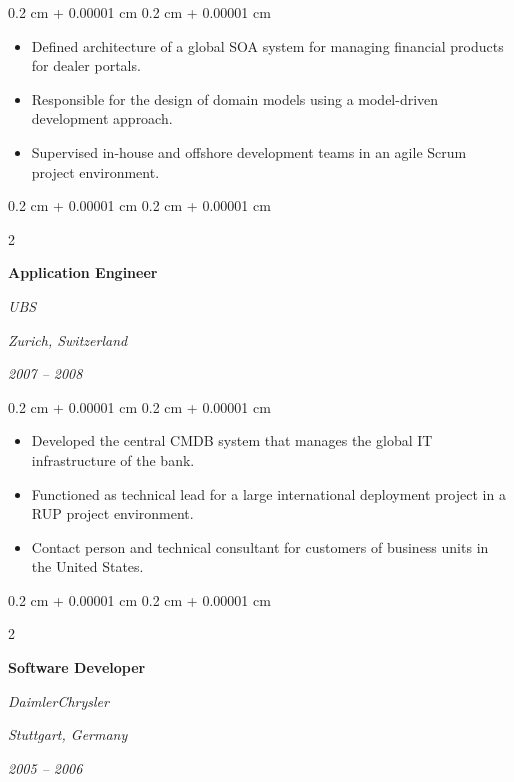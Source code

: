 \documentclass[10pt, a4paper]{article}
\newenvironment{highlights}{
    \begin{itemize}[
        topsep=0.10 cm,
        parsep=0.10 cm,
        partopsep=0pt,
        itemsep=0pt,
        leftmargin=0.4 cm + 10pt
    ]
}{
    \end{itemize}
} %
\newenvironment{onecolentry}{
    \begin{adjustwidth}{
        0.2 cm + 0.00001 cm
    }{
        0.2 cm + 0.00001 cm
    }
}{
    \end{adjustwidth}
} %
\newenvironment{twocolentry}[2][]{
    \onecolentry
    \def\secondColumn{#2}
    \setcolumnwidth{\fill, 8 cm}
    \begin{paracol}{2}
}{
    \switchcolumn \raggedleft \secondColumn
    \end{paracol}
    \endonecolentry
} %
\begin{document}
\vspace{0.10 cm}
\begin{onecolentry}
    \begin{highlights}
        \item Defined architecture of a global SOA system for managing financial products for dealer portals.
        \item Responsible for the design of domain models using a model-driven development approach.
        \item Supervised in-house and offshore development teams in an agile Scrum project environment.
    \end{highlights}
\end{onecolentry}

\vspace{0.20 cm}



%
%
\begin{twocolentry}{
        \textit{Zurich, Switzerland}

        \textit{2007 – 2008}}
    \textbf{Application Engineer}

    \textit{UBS}
\end{twocolentry}

\vspace{0.10 cm}
\begin{onecolentry}
    \begin{highlights}
        \item Developed the central CMDB system that manages the global IT infrastructure of the bank.
        \item Functioned as technical lead for a large international deployment project in a RUP project environment.
        \item Contact person and technical consultant for customers of business units in the United States.
    \end{highlights}
\end{onecolentry}

\vspace{0.20 cm}



%
%
\begin{twocolentry}{
        \textit{Stuttgart, Germany}

        \textit{2005 – 2006}}
    \textbf{Software Developer}

    \textit{DaimlerChrysler}
\end{twocolentry}
\end{document}

